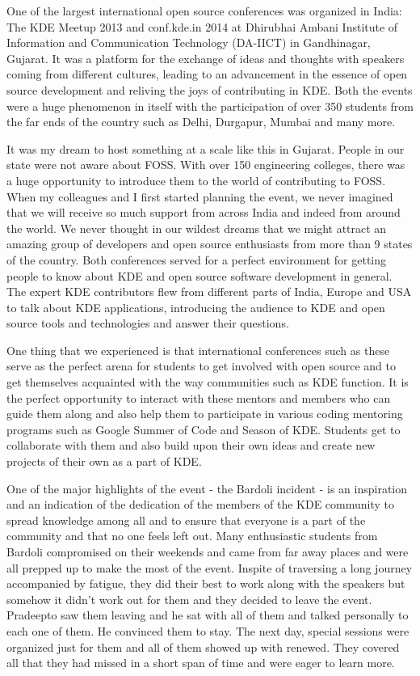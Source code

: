 
\noindent{}One of the largest international open source conferences was organized in India: The KDE Meetup 2013 and conf.kde.in 2014 at Dhirubhai Ambani Institute of Information and Communication Technology (DA-IICT) in Gandhinagar, Gujarat. It was a platform for the exchange of ideas and thoughts with speakers coming from different cultures, leading to an advancement in the essence of open source development and reliving the joys of contributing in KDE. Both the events were a huge phenomenon in itself with the participation of over 350 students from the far ends of the country such as Delhi, Durgapur, Mumbai and many more. 

It was my dream to host something at a scale like this in Gujarat. People in our state were not aware about FOSS. With over 150 engineering colleges, there was a huge opportunity to introduce them to the world of contributing to FOSS. When my colleagues and I first started planning the event, we never imagined that we will receive so much support from across India and indeed from around the world. We never thought in our wildest dreams that we might attract an amazing group of developers and open source enthusiasts from more than 9 states of the country. Both conferences served for a perfect environment for getting people to know about KDE and open source software development in general. The expert KDE contributors flew from different parts of India, Europe and USA to talk about KDE applications, introducing the audience to KDE and open source tools and technologies and answer their questions. 

One thing that we experienced is that international conferences such as these serve as the perfect arena for students to get involved with open source and to get themselves acquainted with the way communities such as KDE function. It is the perfect opportunity to interact with these mentors and members who can guide them along and also help them to participate in various coding mentoring programs such as Google Summer of Code and Season of KDE. Students get to collaborate with them and also build upon their own ideas and create new projects of their own as a part of KDE.

One of the major highlights of the event - the Bardoli incident - is an inspiration and an indication of the dedication of the members of the KDE community to spread knowledge among all and to ensure that everyone is a part of  the community and that no one feels left out. Many enthusiastic students from Bardoli compromised on their weekends and came from far away places and were all prepped up to make the most of the event. Inspite of traversing a long journey accompanied by fatigue, they did their best to work along with the speakers but somehow it didn’t work out for them and they decided to leave the event. Pradeepto saw them leaving and he sat with all of them and talked personally to each one of them. He convinced them to stay. The next day, special sessions were organized just for them and all of them showed up with renewed. They covered all that they had missed in a short span of time and were eager to learn more.

